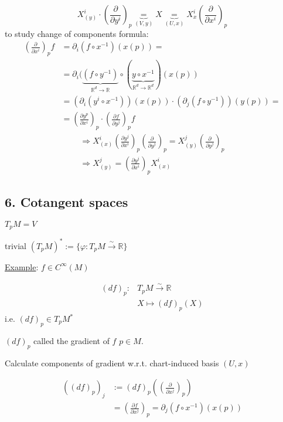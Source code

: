 \documentclass[10pt, twoside]{amsart}
\begin{document}
\begin{multicols*}{2}
\[
X^i_{(y)}\cdot \left( \frac{ \partial }{ \partial y^i} \right)_p \underbrace{=}_{(V,y)} X \underbrace{=}_{ (U,x) } X^i_{x} \left( \frac{ \partial }{ \partial x^i} \right)_p
\]
to study change of components formula:
\[
\begin{aligned}
  \left( \frac{ \partial }{ \partial x^i} \right)_p f & = \partial_i(f\circ x^{-1} )(x(p)) =  \\
  & = \partial_i (\underbrace{ (f\circ y^{-1}) }_{\mathbb{R}^d \to \mathbb{R} } \circ (\underbrace{ y\circ x^{-1}}_{\mathbb{R}^d \to \mathbb{R}^d} )(x(p)) \\
  & = (\partial_i (y^i\circ x^{-1} ) )(x(p)) \cdot (\partial_j (f\circ y^{-1}) )(y(p)) = \\
  & = \boxed{ \left( \frac{ \partial y^p}{ \partial x^i} \right)_p \cdot \left( \frac{ \partial f}{ \partial y^j} \right)_p  } f
\end{aligned}
\]
\[
\begin{gathered}
  \Longrightarrow X^i_{(x)} \left( \frac{ \partial y^j}{ \partial x^i} \right)_p \left( \frac{ \partial }{ \partial y^j} \right)_p = X^j_{(y)}\left( \frac{ \partial }{ \partial y^j} \right)_p \\
  \Longrightarrow \boxed{ X^j_{(y)} = \left( \frac{ \partial y^j}{ \partial x^i} \right)_pX^i_{(x)} }
\end{gathered}
\]

\subsection{6. Cotangent spaces }

$T_pM = V$

trivial $(T_pM)^* := \lbrace \varphi : T_pM \xrightarrow{\sim} \mathbb{R} \rbrace$

\underline{Example}: $f\in C^{\infty}(M)$ 

\[
\begin{aligned}
  (df)_p : & T_p M \xrightarrow{ \sim } \mathbb{R} \\ 
  & X \mapsto (df)_p(X)
\end{aligned}
\]
i.e. $\boxed{ (df)_p \in T_pM^* } $

$(df)_p$ called the gradient of $f$ \@ $p\in M$.  

Calculate components of gradient w.r.t. chart-induced basis $(U,x)$  

\[
\begin{aligned}
  \left( (df)_p \right)_j & := (df)_p\left( \left( \frac{ \partial }{ \partial x^j} \right)_p \right) \\
  & = \left( \frac{ \partial f}{ \partial x^j } \right)_p = \partial_j (f\circ x^{-1} )(x(p))
\end{aligned}
\]


\end{multicols*}
\end{document}
